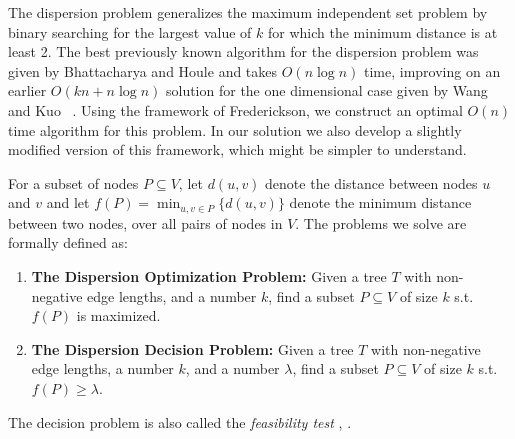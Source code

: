 \documentclass[11pt,a4paper]{article}
\newcommand{\Oh}{{O}}
\theoremstyle{definition}
\newtheorem{definition}{Definition}
\theoremstyle{remark}
\begin{document}
The dispersion problem generalizes the maximum independent set problem by binary searching for the largest value of $k$ for which the minimum distance is at least 2. The best previously known algorithm for the dispersion problem was given by Bhattacharya and Houle \cite{Bhattacharya1991} and takes $\Oh(n\log n)$ time, improving on an earlier $\Oh(kn+n\log n)$ solution for the one dimensional case given by Wang and Kuo~\cite{Wang1988} . Using the framework of Frederickson, we construct an optimal $\Oh(n)$ time algorithm for this problem. In our solution we also develop a slightly modified version of this framework, which might be simpler to understand. 

For a subset of nodes $P\subseteq V$, let $d(u,v)$ denote the distance between nodes $u$ and $v$ and let $f(P)=\min_{u,v\in P} \{d(u,v)\}$ denote the minimum distance between two nodes, over all pairs of nodes in $V$. The problems we solve are formally defined as: 

\begin{enumerate}
\item {\bf The Dispersion Optimization Problem:} Given a tree $T$ with non-negative edge lengths, and a  number $k$, find a subset $P\subseteq V$ of size $k$ s.t.  $f(P)$ is maximized. 

\item {\bf The Dispersion Decision Problem:}  Given a tree $T$ with non-negative edge lengths, a number $k$, and a number $\lambda$, find a subset $P\subseteq V$ of size $k$ s.t. $f(P)\geq\lambda$.
\end{enumerate}

\noindent The decision problem is also called the {\em feasibility test} \cite{Frederickson1991}, \cite{Bhattacharya1991}.

%
%
\end{document}
